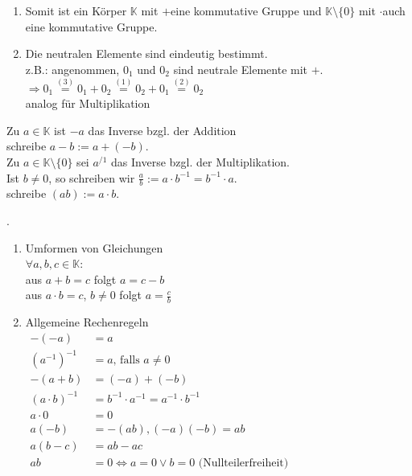 \documentclass[../ana1.tex]{subfiles}
\begin{document}
\begin{bem}
	\begin{enumerate}.%
		\item Somit ist ein Körper $\mathbb{K}$ mit \glqq $+$\grqq eine kommutative Gruppe und $\mathbb{K} \setminus \{0\}$ mit \glqq $\cdot$\grqq auch eine kommutative Gruppe.
		\item Die neutralen Elemente sind eindeutig bestimmt.\\
		      z.B.: angenommen, $0_1$ und $0_2$ sind neutrale Elemente mit \glqq $+$\grqq .\\
		      $\Rightarrow 0_1 \overset{(3)}{=} 0_1 + 0_2 \overset{(1)}{=} 0_2 + 0_1 \overset{(2)}{=} 0_2$\\
		      analog für Multiplikation
	\end{enumerate}
\end{bem}
\begin{defi}
	Zu $a\in \mathbb{K}$ ist $-a$ das Inverse bzgl. der Addition\\
	schreibe $a-b := a + (-b)$.\\
	Zu $a\in\mathbb{K}\setminus\{0\}$ sei $a^{/1}$ das Inverse bzgl. der Multiplikation.\\
	Ist $b\neq 0$, so schreiben wir $\frac{a}{b} := a\cdot b^{-1} =b^{-1}\cdot a$.\\
	schreibe $(ab) := a\cdot b$.
\end{defi}
\begin{lem}.%
	\begin{enumerate}
		\item Umformen von Gleichungen\\
		      $\forall a,b,c\in\mathbb{K}:$\\
		      aus $a+b=c$ folgt $a=c-b$\\
		      aus $a\cdot b=c$, $b\neq 0$ folgt $a=\frac{c}{b}$
		\item Allgemeine Rechenregeln\\
		      $\begin{aligned}
				      -(-a)           & = a                                                               \\
				      (a^{-1})^{-1}   & =a\text{, falls }a\neq 0                                          \\
				      -(a+b)          & = (-a) + (-b)                                                     \\
				      (a\cdot b)^{-1} & =b^{-1}\cdot a^{-1}=a^{-1}\cdot b^{-1}                            \\
				      a\cdot 0        & =0                                                                \\
				      a(-b)           & =-(ab), (-a)(-b)=ab                                               \\
				      a(b-c)          & = ab - ac                                                         \\
				      ab              & = 0 \Leftrightarrow a = 0 \vee b = 0 \text{ (Nullteilerfreiheit)} \\
			      \end{aligned}$
	\end{enumerate}
\end{lem}
\end{document}
